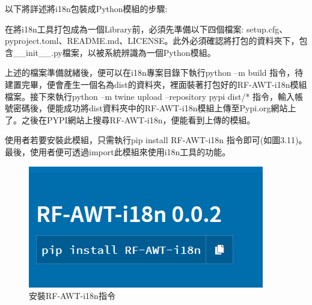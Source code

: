 以下將詳述將i18n包裝成Python模組的步驟:

在將i18n工具打包成為一個Library前，必須先準備以下四個檔案: setup.cfg、pyproject.toml、README.md、LICENSE\cite{license}。此外必須確認將打包的資料夾下，包含\_\_init\_\_.py檔案，以被系統辨識為一個Python模組。

上述的檔案準備就緒後，便可以在i18n專案目錄下執行python –m build 指令，待建置完畢，便會產生一個名為dist的資料夾，裡面裝著打包好的RF-AWT-i18n模組檔案。接下來執行python –m twine upload –repository pypi dist/* 指令，輸入帳號密碼後，便能成功將dist資料夾中的RF-AWT-i18n模組上傳至Pypi.org網站上了。之後在PYPI網站上搜尋RF-AWT-i18n，便能看到上傳的模組。

使用者若要安裝此模組，只需執行pip install RF-AWT-i18n 指令即可(如圖3.11)。最後，使用者便可透過import此模組來使用i18n工具的功能。

\begin{figure}[H]
    \centering
    \includegraphics[width= .5\textwidth]{../論文截圖/3-5-8 安裝RF-AWT-i18n指令.png}
    \caption{安裝RF-AWT-i18n指令}
\end{figure}